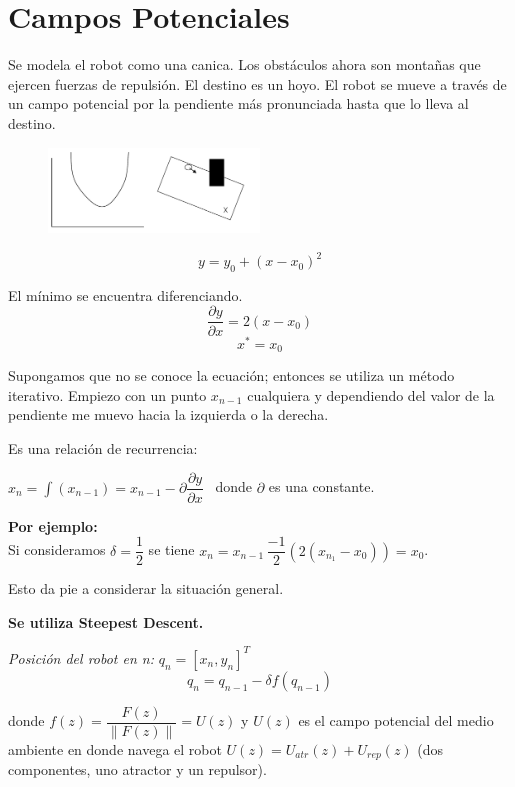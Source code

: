 \section{Campos Potenciales}

Se modela el robot como una canica. Los obstáculos ahora son montañas que ejercen fuerzas de repulsión. El destino es un hoyo.
El robot se mueve a través de un campo potencial por la pendiente más pronunciada hasta que lo lleva al destino.

\begin{figure}[h!]
	\centering
	\includegraphics[width=0.5\textwidth]{images/img58.png}
	\label{figura58}
\end{figure}

$$
y=y_0 + (x-x_0)^2
$$


El mínimo se encuentra diferenciando.
$$
\dfrac{\partial y}{\partial x} = 2(x-x_0)
$$
$$
x^* = x_0
$$

Supongamos que no se conoce la ecuación; entonces se utiliza un método iterativo.
Empiezo con un punto $x_{n-1}$ cualquiera y dependiendo del valor de la pendiente me muevo hacia la izquierda o la derecha.

Es una relación de recurrencia:

\begin{center}
	$ x_n= \int(x_{n-1}) = x_{n-1} - \partial \dfrac{\partial y}{\partial x} $ \,  donde $\partial$ es una constante.	
\end{center}

\textbf{Por ejemplo:} \\
Si consideramos $\delta = \dfrac{1}{2}$ se tiene $x_n = x_{n-1} \, \dfrac{-1}{2}(2(x_{n_1}-x_0)) = x_0$.


Esto da pie a considerar la situación general.

\textbf {Se utiliza Steepest Descent.} 

\textit{Posición del robot en n:} $q_n = \left[x_n,y_n\right]^T$
$$
q_n=q_{n-1}-\delta f (q_{n-1}) $$

donde $f(z)= \dfrac{F(z)}{\|F(z)\|} = U(z)$ y $U(z)$  es el campo potencial del medio ambiente en donde navega el robot $U(z)= U_{atr}(z) + U_{rep}(z)$ (dos componentes, uno atractor y un repulsor).

